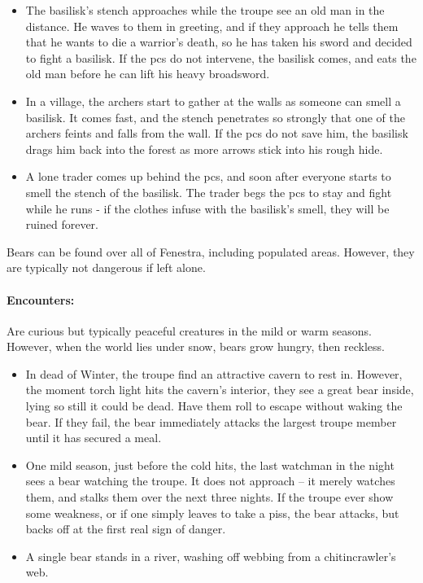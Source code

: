 \begin{multicols}{2}
\begin{itemize}
  \item{The basilisk's stench approaches while the troupe see an old man in the distance.
  He waves to them in greeting, and if they approach he tells them that he wants to die a warrior's death, so he has taken his sword and decided to fight a basilisk.
  If the \glspl{pc} do not intervene, the basilisk comes, and eats the old man before he can lift his heavy broadsword.}
  \item
  In a village, the archers start to gather at the walls as someone can smell a basilisk.
  It comes fast, and the stench penetrates so strongly that one of the archers feints and falls from the wall.
  If the \glspl{pc} do not save him, the basilisk drags him back into the forest as more arrows stick into his rough hide.
  \item
  A lone trader comes up behind the \glspl{pc}, and soon after everyone starts to smell the stench of the basilisk.
  The trader begs the \glspl{pc} to stay and fight while he runs - if the clothes infuse with the basilisk's smell, they will be ruined forever.
\end{itemize}

\label{bear}

Bears can be found over all of Fenestra, including populated areas.
However, they are typically not dangerous if left alone.

\bear

\paragraph{Encounters:} Are curious but typically peaceful creatures in the mild or warm seasons.
However, when the world lies under snow, bears grow hungry, then reckless.

\begin{itemize}
  \item
  In dead of Winter, the troupe find an attractive cavern to rest in.
  However, the moment torch light hits the cavern's interior, they see a great bear inside, lying so still it could be dead.
  Have them roll  to escape without waking the bear.
  If they fail, the bear immediately attacks the largest troupe member until it has secured a meal.
  \item
  One mild season, just before the cold hits, the last watchman in the night sees a bear watching the troupe.
  It does not approach -- it merely watches them, and stalks them over the next three nights.
  If the troupe ever show some weakness, or if one simply leaves to take a piss, the bear attacks, but backs off at the first real sign of danger.
  \item
  A single bear stands in a river, washing off webbing from a chitincrawler's web.
\end{itemize}


\end{multicols}
